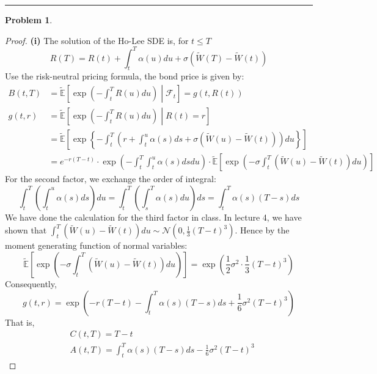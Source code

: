 \documentclass[a4paper, 10pt]{article}
\theoremstyle{definition}
\newtheorem{problem}{Problem}
\theoremstyle{hSol}
\begin{document}
\noindent\rule{16cm}{0.4pt}
\begin{problem} 
\end{problem}
\begin{proof} \textbf{(i)} The solution of the Ho-Lee SDE is, for $t\leq T$
\begin{equation}
  R(T) = R(t) + \int_t^T \alpha(u) du + \sigma (\widetilde{W}(T)-\widetilde{W}(t))
\end{equation}
Use the risk-neutral pricing formula, the bond price is given by:
\begin{equation}
  \begin{split}
    B(t,T) &= \widetilde{\mathbb{E}}\left[\exp\left(-\int_t^T R(u)du\right) \middle| \mathcal{F}_t\right]= g(t,R(t)) \\
    g(t,r) &= \widetilde{\mathbb{E}}\left[\exp\left(-\int_t^T R(u)du\right) \middle| R(t)=r\right]\\
    &= \widetilde{\mathbb{E}}\left[\exp\left\{-\int_t^T \left(r + \int_t^u \alpha(s) ds + \sigma (\widetilde{W}(u)-\widetilde{W}(t))\right)du\right\} \right]\\
    &= e^{-r(T-t)}\cdot\exp\left( -\int_t^T\int_t^u   \alpha(s)ds du\right)\cdot \widetilde{\mathbb{E}}\left[\exp\left(-\sigma\int_t^T(\widetilde{W}(u)-\widetilde{W}(t))du\right)\right]
  \end{split} 
\end{equation}
For the second factor, we exchange the order of integral:
$$
\int_t^T\left(\int_t^u \alpha(s)ds\right) du = \int_t^T\left(\int_s^T \alpha(s)du\right) ds =  \int_t^T \alpha(s)(T-s) ds
$$
We have done the calculation for the third factor in class. In lecture 4, we have shown that $\int_t^T(\widetilde{W}(u)-\widetilde{W}(t))du \sim \mathcal{N}(0,\frac{1}{3}(T-t)^3)$. Hence by the moment generating function of normal variables:
$$
\widetilde{\mathbb{E}}\left[\exp\left(-\sigma\int_t^T(\widetilde{W}(u)-\widetilde{W}(t))du\right)\right] = \exp\left(\frac{1}{2}\sigma^2\cdot \frac{1}{3}(T-t)^3\right)
$$
Consequently,
\begin{equation}
  g(t,r) = \exp\left(  -r(T-t) - \int_t^T \alpha(s)(T-s)ds + \frac{1}{6}\sigma^2(T-t)^3\right)
\end{equation}
That is,
\begin{equation}
  \begin{split}
    &C(t,T) = T-t \\
    &A(t,T) = \int_t^T \alpha(s)(T-s)ds - \frac{1}{6}\sigma^2(T-t)^3
  \end{split}

\end{equation}
\end{proof}
\end{document}
